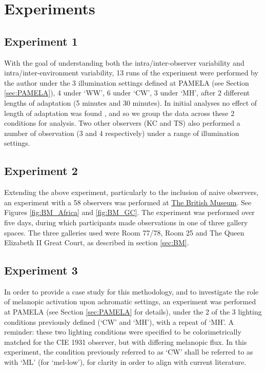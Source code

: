 \clearpage

\section{Experiments}

\subsection{Experiment 1}
With the goal of understanding both the intra/inter-observer variability and intra/inter-environment variability, 13 runs of the experiment were performed by the author under the 3 illumination settings defined at \gls{PAMELA} (see Section \ref{sec:PAMELA}), 4 under `WW', 6 under `CW', 3 under `MH', after 2 different lengths of adaptation (5 minutes and 30 minutes). In initial analyses no effect of length of adaptation was found%
, and so we group the data across these 2 conditions for analysis. Two other observers (KC and TS) also performed a number of observation (3 and 4 respectively) under a range of illumination settings.

\subsection{Experiment 2}

Extending the above experiment, particularly to the inclusion of naive observers, an experiment with a 58 observers was performed at \hyperref[sec:BM]{The British Museum}. See Figures \ref{fig:BM_Africa} and \ref{fig:BM_GC}.
The experiment was performed over five days, during which participants made observations in one of three gallery spaces. The three galleries used were Room 77/78, Room 25 and The Queen Elizabeth II Great Court, as described in section \ref{sec:BM}. 

\subsection{Experiment 3}
In order to provide a case study for this methodology, and to investigate the role of melanopic activation upon achromatic settings, an experiment was performed at \gls{PAMELA} (see Section \ref{sec:PAMELA} for details), under the 2 of the 3 lighting conditions previously defined (`CW' and `MH'), with a repeat of `MH'. A reminder: these two lighting conditions were specified to be colorimetrically matched for the CIE 1931 observer, but with differing melanopic flux. In this experiment, the condition previously referred to as `CW' shall be referred to as with `ML' (for `mel-low'), for clarity in order to align with current literature.

